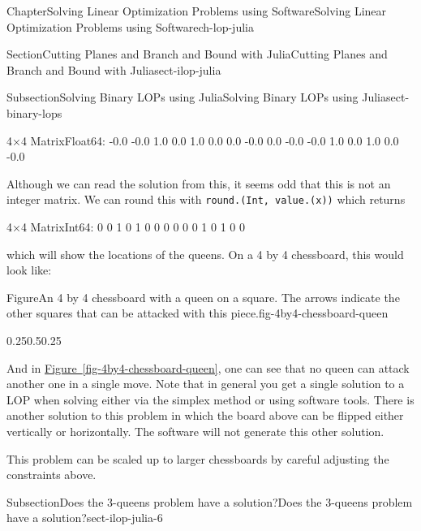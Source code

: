\documentclass[oneside,10pt,]{book}
\newcommand{\xreffont}{\relax}
\newcommand{\mono}[1]{\texttt{#1}}
\numberwithin{equation}{section}
\begin{document}
\begin{chapterptx}{Chapter}{Solving Linear Optimization Problems using Software}{}{Solving Linear Optimization Problems using Software}{}{}{ch-lop-julia}
\begin{sectionptx}{Section}{Cutting Planes and Branch and Bound with Julia}{}{Cutting Planes and Branch and Bound with Julia}{}{}{sect-ilop-julia}
\begin{subsectionptx}{Subsection}{Solving Binary LOPs using Julia}{}{Solving Binary LOPs using Julia}{}{}{sect-binary-lops}
\par
%
\begin{codedisplay}
4×4 Matrix{Float64}:
 -0.0  -0.0   1.0   0.0
  1.0   0.0   0.0  -0.0
  0.0  -0.0  -0.0   1.0
  0.0   1.0   0.0  -0.0
\end{codedisplay}
%
\par
Although we can read the solution from this, it seems odd that this is not an integer matrix. We can round this with \mono{round.(Int, value.(x))} which returns%
\par
%
\begin{codedisplay}
4×4 Matrix{Int64}:
  0  0  1  0
  1  0  0  0
  0  0  0  1
  0  1  0  0
\end{codedisplay}
%
\par
which will show the locations of the queens. On a 4 by 4 chessboard, this would look like:%
\begin{figureptx}{Figure}{An 4 by 4 chessboard with a queen on a square.  The arrows indicate the other squares that can be attacked with this piece.}{fig-4by4-chessboard-queen}{}%
\begin{image}{0.25}{0.5}{0.25}{}%
%
\end{image}%
\tcblower
\end{figureptx}%
And in \hyperref[fig-4by4-chessboard-queen]{Figure~{\xreffont\ref{fig-4by4-chessboard-queen}}}, one can see that no queen can attack another one in a single move.  Note that in general you get a single solution to a LOP when solving either via the simplex method or using software tools.  There is another solution to this problem in which the board above can be flipped either vertically or horizontally.  The software will not generate this other solution.%
\par
This problem can be scaled up to larger chessboards by careful adjusting the constraints above.%
\end{subsectionptx}
%
%
\typeout{************************************************}
\typeout{************************************************}
%
\begin{subsectionptx}{Subsection}{Does the 3-queens problem have a solution?}{}{Does the 3-queens problem have a solution?}{}{}{sect-ilop-julia-6}

\end{subsectionptx}
\end{sectionptx}
\end{chapterptx}
\end{document}
